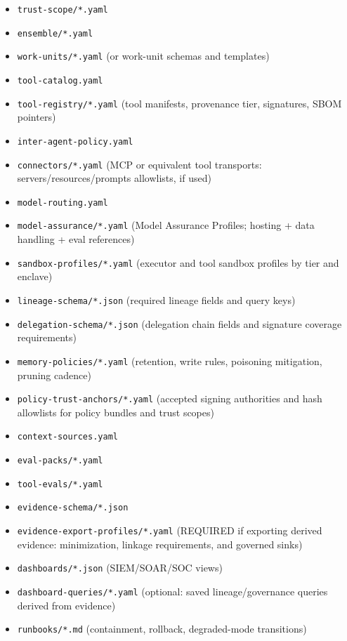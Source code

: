 \documentclass[11pt]{article}
\begin{document}
\begin{itemize}
\tightlist
\item
  \texttt{trust-scope/*.yaml}
\item
  \texttt{ensemble/*.yaml}
\item
  \texttt{work-units/*.yaml} (or work-unit schemas and templates)
\item
  \texttt{tool-catalog.yaml}
\item
  \texttt{tool-registry/*.yaml} (tool manifests, provenance tier,
  signatures, SBOM pointers)
\item
  \texttt{inter-agent-policy.yaml}
\item
  \texttt{connectors/*.yaml} (MCP or equivalent tool transports:
  servers/resources/prompts allowlists, if used)
\item
  \texttt{model-routing.yaml}
\item
  \texttt{model-assurance/*.yaml} (Model Assurance Profiles; hosting +
  data handling + eval references)
\item
  \texttt{sandbox-profiles/*.yaml} (executor and tool sandbox profiles
  by tier and enclave)
\item
  \texttt{lineage-schema/*.json} (required lineage fields and query
  keys)
\item
  \texttt{delegation-schema/*.json} (delegation chain fields and
  signature coverage requirements)
\item
  \texttt{memory-policies/*.yaml} (retention, write rules, poisoning
  mitigation, pruning cadence)
\item
  \texttt{policy-trust-anchors/*.yaml} (accepted signing authorities and
  hash allowlists for policy bundles and trust scopes)
\item
  \texttt{context-sources.yaml}
\item
  \texttt{eval-packs/*.yaml}
\item
  \texttt{tool-evals/*.yaml}
\item
  \texttt{evidence-schema/*.json}
\item
  \texttt{evidence-export-profiles/*.yaml} (REQUIRED if exporting
  derived evidence: minimization, linkage requirements, and governed
  sinks)
\item
  \texttt{dashboards/*.json} (SIEM/SOAR/SOC views)
\item
  \texttt{dashboard-queries/*.yaml} (optional: saved lineage/governance
  queries derived from evidence)
\item
  \texttt{runbooks/*.md} (containment, rollback, degraded-mode
  transitions)
\end{itemize}
\end{document}
